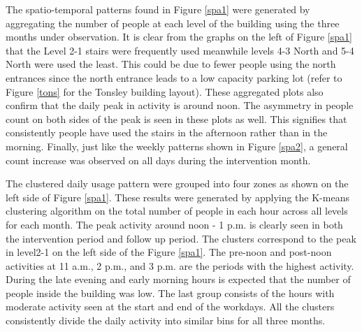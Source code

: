


The spatio-temporal patterns found in Figure \ref{spa1} were generated by aggregating the number of people at each level of the building using the three months under observation. It is clear from the graphs on the left of Figure \ref{spa1} that the Level 2-1 stairs were frequently used meanwhile levels 4-3 North and 5-4 North were used the least. This could be due to fewer people using the north entrances since the north entrance leads to a low capacity parking lot (refer to Figure \ref{tons} for the Tonsley building layout). These aggregated plots also confirm that the daily peak in activity is around noon. The asymmetry in people count on both sides of the peak is seen in these plots as well. This signifies that consistently people have used the stairs in the afternoon rather than in the morning. Finally, just like the weekly patterns shown in Figure \ref{spa2}, a general count increase was observed on all days during the intervention month. 

The clustered daily usage pattern were grouped into four zones as shown on the left side of Figure \ref{spa1}. These results were generated by applying the K-means clustering algorithm on the total number of people in each hour across all levels for each month. The peak activity around noon - 1 p.m. is clearly seen in both the intervention period and follow up period. The clusters correspond to the peak in level2-1 on the left side of the Figure \ref{spa1}. The pre-noon and post-noon activities at 11 a.m., 2 p.m., and 3 p.m. are the periods with the highest activity. During the late evening and early morning hours is expected that the number of people inside the building was low. The last group consists of the hours with moderate activity seen at the start and end of the workdays. All the clusters consistently divide the daily activity into similar bins for all three months. 

